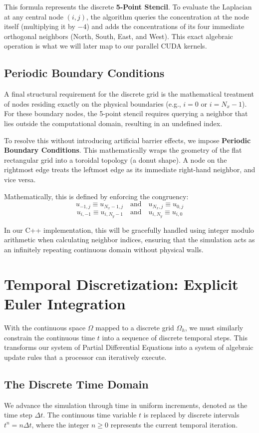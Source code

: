 \documentclass[12pt,a4paper]{article}
\begin{document}
This formula represents the discrete \textbf{5-Point Stencil}. To evaluate the Laplacian at any central node $(i, j)$, the algorithm queries the concentration at the node itself (multiplying it by $-4$) and adds the concentrations of its four immediate orthogonal neighbors (North, South, East, and West). This exact algebraic operation is what we will later map to our parallel CUDA kernels.

\subsection{Periodic Boundary Conditions}
A final structural requirement for the discrete grid is the mathematical treatment of nodes residing exactly on the physical boundaries (e.g., $i = 0$ or $i = N_x - 1$). For these boundary nodes, the 5-point stencil requires querying a neighbor that lies outside the computational domain, resulting in an undefined index.

To resolve this without introducing artificial barrier effects, we impose \textbf{Periodic Boundary Conditions}. This mathematically wraps the geometry of the flat rectangular grid into a toroidal topology (a donut shape). A node on the rightmost edge treats the leftmost edge as its immediate right-hand neighbor, and vice versa.

Mathematically, this is defined by enforcing the congruency:
$$u_{-1, j} \equiv u_{N_x-1, j} \quad \text{and} \quad u_{N_x, j} \equiv u_{0, j}$$
$$u_{i, -1} \equiv u_{i, N_y-1} \quad \text{and} \quad u_{i, N_y} \equiv u_{i, 0}$$

In our C++ implementation, this will be gracefully handled using integer modulo arithmetic when calculating neighbor indices, ensuring that the simulation acts as an infinitely repeating continuous domain without physical walls.

\section{Temporal Discretization: Explicit Euler Integration}

With the continuous space $\Omega$ mapped to a discrete grid $\Omega_h$, we must similarly constrain the continuous time $t$ into a sequence of discrete temporal steps. This transforms our system of Partial Differential Equations into a system of algebraic update rules that a processor can iteratively execute.

\subsection{The Discrete Time Domain}
We advance the simulation through time in uniform increments, denoted as the time step $\Delta t$. The continuous time variable $t$ is replaced by discrete intervals $t^n = n \Delta t$, where the integer $n \ge 0$ represents the current temporal iteration.
\end{document}
